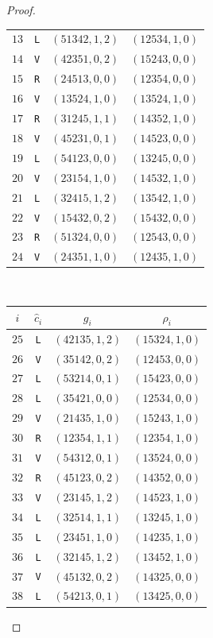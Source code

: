 \documentclass[lualatex,11pt]{article}
\begin{document}
\begin{proof}
\begin{center}
\begin{table}[H]
\begin{center}
\begin{tabular}{c|c|c|c}
   $13$ &   {\tt L} &  $(51342,1,2)$ & $(12534,1,0)$\\
   $14$ &   {\tt V} &  $(42351,0,2)$ & $(15243,0,0)$\\
   $15$ &   {\tt R} &  $(24513,0,0)$ & $(12354,0,0)$\\
   $16$ &   {\tt V} &  $(13524,1,0)$ & $(13524,1,0)$\\
   $17$ &   {\tt R} &  $(31245,1,1)$ & $(14352,1,0)$\\
   $18$ &   {\tt V} &  $(45231,0,1)$ & $(14523,0,0)$\\
   $19$ &   {\tt L} &  $(54123,0,0)$ & $(13245,0,0)$\\
   $20$ &   {\tt V} &  $(23154,1,0)$ & $(14532,1,0)$\\
   $21$ &   {\tt L} &  $(32415,1,2)$ & $(13542,1,0)$\\
   $22$ &   {\tt V} &  $(15432,0,2)$ & $(15432,0,0)$\\
   $23$ &   {\tt R} &  $(51324,0,0)$ & $(12543,0,0)$\\
   $24$ &   {\tt V} &  $(24351,1,0)$ & $(12435,1,0)$\\
   \end{tabular}~~
   \begin{tabular}{c|c|c|c}
    $i$ & $\hat{c}_i$ & $g_i$ & $\rho_i$\\
    \hline
   $25$ &   {\tt L} &  $(42135,1,2)$ & $(15324,1,0)$\\
   $26$ &   {\tt V} &  $(35142,0,2)$ & $(12453,0,0)$\\
   $27$ &   {\tt L} &  $(53214,0,1)$ & $(15423,0,0)$\\
   $28$ &   {\tt L} &  $(35421,0,0)$ & $(12534,0,0)$\\
   $29$ &   {\tt V} &  $(21435,1,0)$ & $(15243,1,0)$\\
   $30$ &   {\tt R} &  $(12354,1,1)$ & $(12354,1,0)$\\
   $31$ &   {\tt V} &  $(54312,0,1)$ & $(13524,0,0)$\\
   $32$ &   {\tt R} &  $(45123,0,2)$ & $(14352,0,0)$\\
   $33$ &   {\tt V} &  $(23145,1,2)$ & $(14523,1,0)$\\
   $34$ &   {\tt L} &  $(32514,1,1)$ & $(13245,1,0)$\\
   $35$ &   {\tt L} &  $(23451,1,0)$ & $(14235,1,0)$\\
   $36$ &   {\tt L} &  $(32145,1,2)$ & $(13452,1,0)$\\
   $37$ &   {\tt V} &  $(45132,0,2)$ & $(14325,0,0)$\\
   $38$ &   {\tt L} &  $(54213,0,1)$ & $(13425,0,0)$\\

\end{tabular}
\end{center}
\end{table}
\end{center}
\end{proof}
\end{document}
